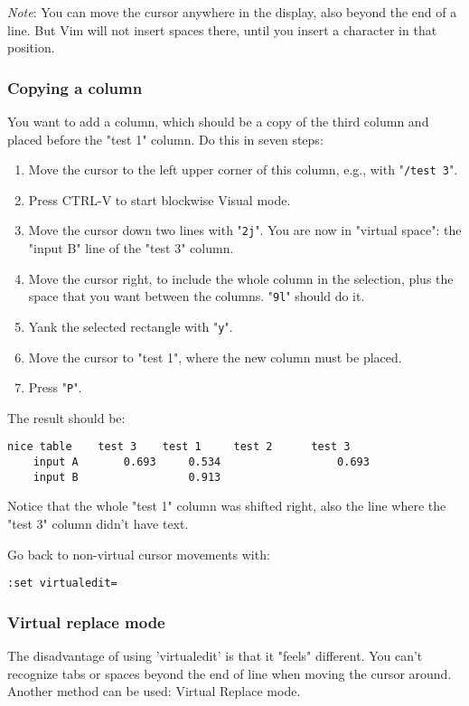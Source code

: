 \emph{Note}: You can move the cursor anywhere in the display, also beyond the end of a line.
But Vim will not insert spaces there, until you insert a character in that position.

\subsubsection{Copying a column}
You want to add a column, which should be a copy of the third column and placed before the "test 1" column.
Do this in seven steps:

\begin{enumerate}
\item Move the cursor to the left upper corner of this column, e.g., with "\verb!/test 3!".
\item Press CTRL-V to start blockwise Visual mode.
\item Move the cursor down two lines with "\verb!2j!".  You are now in "virtual space": the "input B" line of the "test 3" column.
\item Move the cursor right, to include the whole column in the selection, plus the space that you want between the columns.  "\verb!9l!" should do it.
\item Yank the selected rectangle with "\verb!y!".
\item Move the cursor to "test 1", where the new column must be placed.
\item Press "\verb!P!".
\end{enumerate}

The result should be:

\begin{Verbatim}[samepage=true]
    nice table    test 3    test 1     test 2      test 3 
    input A       0.693     0.534                  0.693 
    input B                 0.913 
\end{Verbatim}

Notice that the whole "test 1" column was shifted right, also the line where the "test 3" column didn't have text.

Go back to non-virtual cursor movements with:

\begin{Verbatim}[samepage=true]
 :set virtualedit=
\end{Verbatim}

\subsubsection{Virtual replace mode}
The disadvantage of using 'virtualedit' is that it "feels" different.
You can't recognize tabs or spaces beyond the end of line when moving the cursor around.
Another method can be used: Virtual Replace mode.

